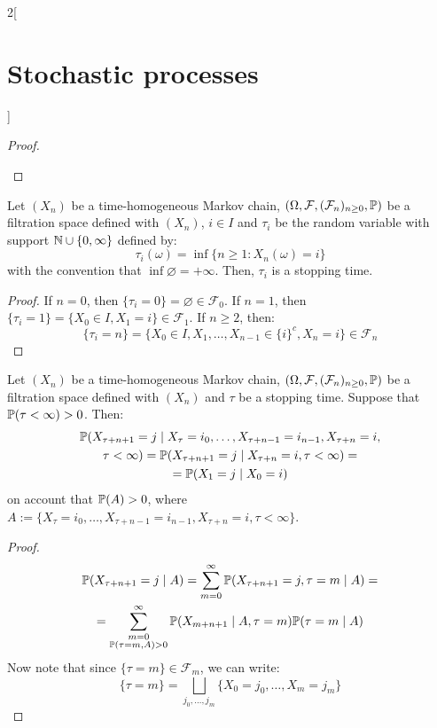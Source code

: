\documentclass[../../../main_math.tex]{subfiles}
\begin{document}
\begin{multicols}{2}[\section{Stochastic processes}]
\begin{proof}
\begin{itemizeiff}
    \end{itemizeiff}
  \end{proof}
  \begin{proposition}
    Let $(X_n)$ be a time-homogeneous Markov chain, $(\Omega,\mathcal{F},(\mathcal{F}_n)_{n\geq 0},\mathbb{P})$ be a filtration space defined with $(X_n)$, $i\in I$ and $\tau_i$ be the random variable with support $\mathbb{N}\cup\{0,\infty\}$ defined by:
    \begin{equation}\label{SP:tau_i}
      \tau_i(\omega)=\inf\{n\geq 1:X_n(\omega)=i\}
    \end{equation}
    with the convention that $\inf\varnothing=+\infty$.
    Then, $\tau_i$ is a stopping time.
  \end{proposition}
  \begin{proof}
    If $n=0$, then $\{\tau_i=0\}=\varnothing\in\mathcal{F}_0$. If $n=1$, then $\{\tau_i=1\}=\{X_0\in I,X_1=i\}\in\mathcal{F}_1$. If $n\geq 2$, then:
    $$\{\tau_i=n\}=\{X_0\in I,X_1,\ldots,X_{n-1}\in  \{i\}^c,X_n=i\}\in\mathcal{F}_n$$
  \end{proof}
  \begin{theorem}\label{SP:MarkovStrong}
    Let $(X_n)$ be a time-homogeneous Markov chain, $(\Omega,\mathcal{F},(\mathcal{F}_n)_{n\geq 0},\mathbb{P})$ be a filtration space defined with $(X_n)$ and $\tau$ be a stopping time. Suppose that $\mathbb{P}(\tau<\infty)>0$. Then:
    \begin{multline*}
      \mathbb{P}(X_{\tau+n+1}=j\mid X_{\tau}=i_0,\ldots,X_{\tau+n-1}=i_{n-1},X_{\tau +n}=i,\\\tau<\infty)=\mathbb{P}(X_{\tau+n+1}=j\mid X_{\tau+n}=i,\tau<\infty)=\\=\mathbb{P}(X_{1}=j\mid X_0=i)
    \end{multline*}
    on account that $\mathbb{P}(A)>0$, where $A:=\{X_{\tau}=i_0,\ldots,X_{\tau+n-1}=i_{n-1},X_{\tau +n}=i,\tau<\infty\}$.
  \end{theorem}
  \begin{proof}
    \begin{multline*}
      \mathbb{P}(X_{\tau+n+1}=j\mid A) =\sum_{m=0}^{\infty}\mathbb{P}(X_{\tau+n+1}=j,\tau=m\mid A)= \\
      =\sum_{\substack{m=0 \\\mathbb{P}(\tau=m,A)>0}}^{\infty}\mathbb{P}(X_{m+n+1}\mid A,\tau=m)\mathbb{P}(\tau=m\mid A)
    \end{multline*}
    Now note that since $\{\tau=m\}\in\mathcal{F}_m$, we can write:
    \begin{equation*}
      \{\tau=m\}=\bigsqcup_{j_0,\ldots,j_m}\{X_0=j_0,\ldots,X_m=j_m\}

\end{equation*}
\end{proof}
\end{multicols}
\end{document}
